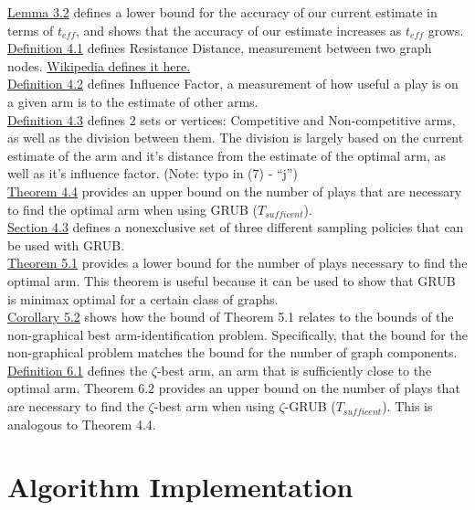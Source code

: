 \documentclass{article}[12pt]
\begin{document}
\underline{Lemma 3.2} defines a lower bound for the accuracy of our current estimate in terms of $t_{eff}$,
and shows that the accuracy of our estimate increases as $t_{eff}$ grows. \\

\underline{Definition 4.1} defines Resistance Distance, measurement between two graph nodes.
\href{https://en.wikipedia.org/wiki/Resistance_distance}{Wikipedia defines it here.} \\

\underline{Definition 4.2} defines Influence Factor, a measurement of how useful a play is on a given arm is to the estimate of other arms. \\

\underline{Definition 4.3} defines 2 sets or vertices: Competitive and Non-competitive arms, as well as the division between them.
The division is largely based on the current estimate of the arm and it’s distance from the estimate of the optimal arm, as well as it’s influence factor.
(Note: typo in (7) - “j”) \\

\underline{Theorem 4.4} provides an upper bound on the number of plays that are necessary to find the optimal arm when using GRUB ($T_{sufficent}$). \\

\underline{Section 4.3} defines a nonexclusive set of three different sampling policies that can be used with GRUB. \\

\underline{Theorem 5.1} provides a lower bound for the number of plays necessary to find the optimal arm.
This theorem is useful because it can be used to show that GRUB is minimax optimal for a certain class of graphs. \\

\underline{Corollary 5.2} shows how the bound of Theorem 5.1 relates to the bounds of the non-graphical best arm-identification problem.
Specifically, that the bound for the non-graphical problem matches the bound for the number of graph components. \\

\underline{Definition 6.1} defines the $\zeta$-best arm, an arm that is sufficiently close to the optimal arm.
Theorem 6.2 provides an upper bound on the number of plays that are necessary to find the $\zeta$-best arm when using $\zeta$-GRUB ($T_{sufficent}$). This is analogous to Theorem 4.4.


\section{Algorithm Implementation}
\end{document}
